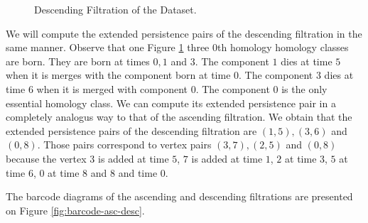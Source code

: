 \begin{figure}[h]
    \qquad \qquad

    \caption{Descending Filtration of the Dataset.}%
    \label{fig:desc-filtration}%
\end{figure}

We will compute the extended persistence pairs of the descending filtration in the same manner. Observe that one Figure \ref{fig:desc-filtration} three 0th homology homology classes are born. They are born at times $0, 1$ and $3$. The component $1$ dies at time $5$ when it is merges with the component born at time $0$. The component $3$ dies at time $6$ when it is merged with component $0$. The component $0$ is the only essential homology class. We can compute its extended persistence pair in a completely analogus way to that of the ascending filtration. We obtain that the extended persistence pairs of the descending filtration are $(1, 5), (3, 6)$ and $(0, 8)$. Those pairs correspond to vertex pairs $(3, 7), (2, 5)$ and $(0, 8)$
because the vertex $3$ is added at time $5$, $7$ is added at time $1$, $2$ at time $3$, $5$ at time $6$, $0$ at time $8$ and $8$ and time $0$.

The barcode diagrams of the ascending and descending filtrations are presented on Figure \ref{fig:barcode-asc-desc}.



